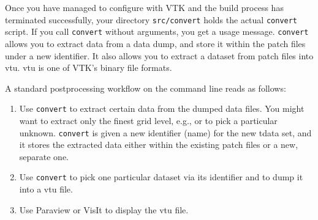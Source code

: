 \noindent
Once you have managed to configure with VTK and the build process has terminated
successfully, your directory \texttt{src/convert} holds the actual \texttt{convert}
script.
If you call \texttt{convert} without arguments, you get a usage message.
\texttt{convert} allows you to extract data from a data dump, and store it
within the patch files under a new identifier.
It also allows you to extract a dataset from patch files into vtu.
vtu is one of VTK's binary file formats.


A standard postprocessing workflow on the command line reads as follows:
\begin{enumerate}
  \item Use \texttt{convert} to extract certain data from the dumped data files.
  You might want to extract only the finest grid level, e.g., or to pick a
  particular unknown. \texttt{convert} is given a new identifier (name) for the
  new tdata set, and it stores the extracted data either within the existing
  patch files or a new, separate one.
  \item Use \texttt{convert} to pick one particular dataset via its identifier
  and to dump it into a vtu file.
  \item Use Paraview or VisIt to display the vtu file.
\end{enumerate}



    


